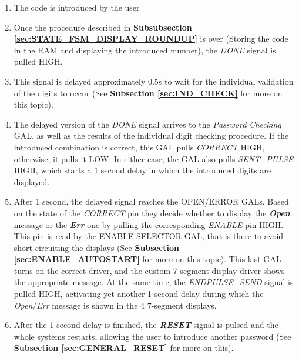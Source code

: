 \begin{enumerate}
    \item The code is introduced by the user
    
    \item Once the procedure described in \textbf{Subsubsection \ref{sec:STATE_FSM_DISPLAY_ROUNDUP}} is over (Storing the code in the RAM and displaying the introduced number), the \textit{DONE} signal is pulled HIGH.
    
    \item This signal is delayed approximately 0.5s to wait for the individual validation of the digits to occur (See \textbf{Subsection \ref{sec:IND_CHECK}} for more on this topic). 
    
    \item The delayed version of the \textit{DONE} signal arrives to the \textit{Password Checking} GAL, as well as the results of the individual digit checking procedure. If the introduced combination is correct, this GAL pulls \textit{CORRECT} HIGH, otherwise, it pulls it LOW. In either case, the GAL also pulls \textit{SENT\_PULSE} HIGH, which starts a 1 second delay in which the introduced digits are displayed.
    
    \item After 1 second, the delayed signal reaches the OPEN/ERROR GALs. Based on the state of the \textit{CORRECT} pin they decide whether to display the \textbf{\textit{Open}} message or the \textbf{\textit{Err}} one by pulling the corresponding \textit{ENABLE} pin HIGH. This pin is read by the ENABLE SELECTOR GAL, that is there to avoid short-circuiting the displays (See \textbf{Subsection \ref{sec:ENABLE_AUTOSTART}} for more on this topic). This last GAL turns on the correct driver, and the custom 7-segment display driver shows the appropriate message. At the same time, the \textit{ENDPULSE\_SEND} signal is pulled HIGH, activating yet another 1 second delay during which the \textit{Open}/\textit{Err} message is shown in the 4 7-segment displays. 
    
    \item After the 1 second delay is finished, the \textbf{\textit{RESET}} signal is pulsed and the whole systems restarts, allowing the user to introduce another password (See \textbf{Subsection \ref{sec:GENERAL_RESET}} for more on this).
\end{enumerate}



